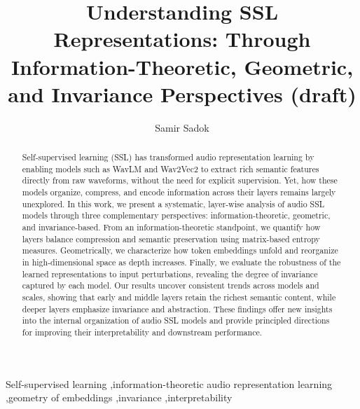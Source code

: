 \documentclass[5p]{elsarticle}
\begin{document}
\begin{frontmatter}

\title{Understanding SSL Representations: Through Information-Theoretic, Geometric, and Invariance Perspectives (draft)}

\author[1]{Samir Sadok}
\address[1]{Inria at Univ. Grenoble Alpes, CNRS, LJK, France}


\begin{abstract}
Self-supervised learning (SSL) has transformed audio representation learning by enabling models such as WavLM and Wav2Vec2 to extract rich semantic features directly from raw waveforms, without the need for explicit supervision. Yet, how these models organize, compress, and encode information across their layers remains largely unexplored.
In this work, we present a systematic, layer-wise analysis of audio SSL models through three complementary perspectives: information-theoretic, geometric, and invariance-based. From an information-theoretic standpoint, we quantify how layers balance compression and semantic preservation using matrix-based entropy measures. Geometrically, we characterize how token embeddings unfold and reorganize in high-dimensional space as depth increases. Finally, we evaluate the robustness of the learned representations to input perturbations, revealing the degree of invariance captured by each model.
Our results uncover consistent trends across models and scales, showing that early and middle layers retain the richest semantic content, while deeper layers emphasize invariance and abstraction. These findings offer new insights into the internal organization of audio SSL models and provide principled directions for improving their interpretability and downstream performance.
\end{abstract}

\begin{keyword}
Self-supervised learning \sep information-theoretic audio representation learning \sep geometry of embeddings \sep invariance \sep interpretability
\end{keyword}

\end{frontmatter}

\end{document}

